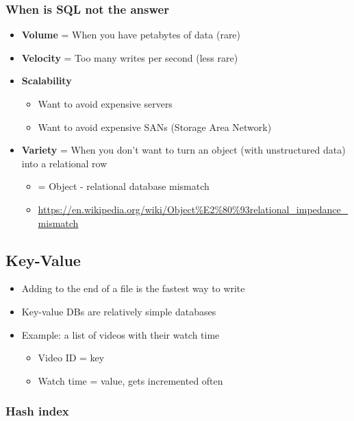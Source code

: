 \documentclass{article}
\begin{document}
\subsubsection{When is SQL not the answer}

\begin{itemize}
    \item \textbf{Volume} = When you have petabytes of data (rare)
    \item \textbf{Velocity} = Too many writes per second (less rare)
    \item \textbf{Scalability}
    \begin{itemize}
        \item Want to avoid expensive servers
        \item Want to avoid expensive SANs (Storage Area Network)
    \end{itemize}
    \item \textbf{Variety} = When you don't want to turn an object (with unstructured data) into a relational row
    \begin{itemize}
        \item = Object - relational database mismatch
        \item \url{https://en.wikipedia.org/wiki/Object%E2%80%93relational_impedance_mismatch}
    \end{itemize}
\end{itemize}

\subsection{Key-Value}



\begin{itemize}
    \item Adding to the end of a file is the fastest way to write
    \item Key-value DBs are relatively simple databases
    \item Example: a list of videos with their watch time
    \begin{itemize}
        \item Video ID = key
        \item Watch time = value, gets incremented often
    \end{itemize}
\end{itemize}

\subsubsection{Hash index}
\end{document}

